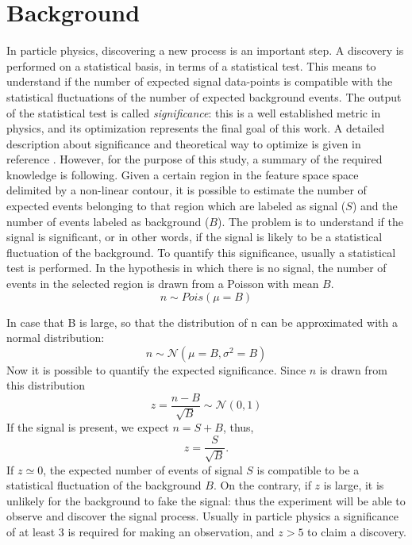 \documentclass{article}
\begin{document}
\section{Background}
\label{sec:backgroiund}

In particle physics, discovering a new process is an important step. A discovery is performed on a statistical basis, in terms of a statistical test. This means to understand if the number of expected signal data-points is compatible with the statistical fluctuations of the number of expected background events. The output of the statistical test is called \textit{significance}: this is a well established metric in physics, and its optimization represents the final goal of this work. A detailed description about significance and theoretical way to optimize is given in reference \cite{Punzi_significance}. However, for the purpose of this study, a summary of the required knowledge is following.
Given a certain region in the feature space space delimited by a non-linear contour, it is possible to estimate the number of expected events belonging to that region which are labeled as signal ($S$) and the number of events labeled as background ($B$). The problem is to understand if the signal is significant, or in other words, if the signal is likely to be a statistical fluctuation of the background. To quantify this significance, usually a statistical test is performed. In the hypothesis in which there is no signal, the number of events in the selected region is drawn from a Poisson with mean $B$.
\[ n \sim Pois(\mu = B) \]

In case that B is large, so that the distribution of n can be approximated with a normal distribution:
\[ n \sim \mathcal{N}(\mu = B, \sigma^2 = B) \]
Now it is possible to quantify the expected significance. Since $n$ is drawn from this distribution 
\[z = \frac{n-B}{\sqrt{B}} \sim \mathcal{N}(0, 1)\]
If the signal is present, we expect $n = S + B$, thus, 
\[z = \frac{S}{\sqrt{B}}.\]
If $z \simeq 0$, the expected number of events of signal $S$ is compatible to be a statistical fluctuation of the background $B$. On the contrary, if $z$ is large, it is unlikely for the background to fake the signal: thus the experiment will be able to observe and discover the signal process. Usually in particle physics a significance of at least 3 is required for making an observation, and $z > 5$ to claim a discovery. 
\end{document}
